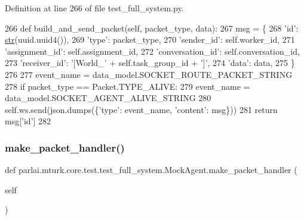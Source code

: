 Definition at line 266 of file test\+\_\+full\+\_\+system.\+py.


\begin{DoxyCode}
266     \textcolor{keyword}{def }build\_and\_send\_packet(self, packet\_type, data):
267         msg = \{
268             \textcolor{stringliteral}{'id'}: \hyperlink{namespacegenerate__task__READMEs_a5b88452ffb87b78c8c85ececebafc09f}{str}(uuid.uuid4()),
269             \textcolor{stringliteral}{'type'}: packet\_type,
270             \textcolor{stringliteral}{'sender\_id'}: self.worker\_id,
271             \textcolor{stringliteral}{'assignment\_id'}: self.assignment\_id,
272             \textcolor{stringliteral}{'conversation\_id'}: self.conversation\_id,
273             \textcolor{stringliteral}{'receiver\_id'}: \textcolor{stringliteral}{'[World\_'} + self.task\_group\_id + \textcolor{stringliteral}{']'},
274             \textcolor{stringliteral}{'data'}: data,
275         \}
276 
277         event\_name = data\_model.SOCKET\_ROUTE\_PACKET\_STRING
278         \textcolor{keywordflow}{if} packet\_type == Packet.TYPE\_ALIVE:
279             event\_name = data\_model.SOCKET\_AGENT\_ALIVE\_STRING
280         self.ws.send(json.dumps(\{\textcolor{stringliteral}{'type'}: event\_name, \textcolor{stringliteral}{'content'}: msg\}))
281         \textcolor{keywordflow}{return} msg[\textcolor{stringliteral}{'id'}]
282 
\end{DoxyCode}
\mbox{\label{classparlai_1_1mturk_1_1core_1_1test_1_1test__full__system_1_1MockAgent_a872f69350ed59fcccfa5819f2bd65337}} 
\subsubsection{\texorpdfstring{make\+\_\+packet\+\_\+handler()}{make\_packet\_handler()}}
{\footnotesize\ttfamily def parlai.\+mturk.\+core.\+test.\+test\+\_\+full\+\_\+system.\+Mock\+Agent.\+make\+\_\+packet\+\_\+handler (\begin{DoxyParamCaption}\item[{}]{self }\end{DoxyParamCaption})}

